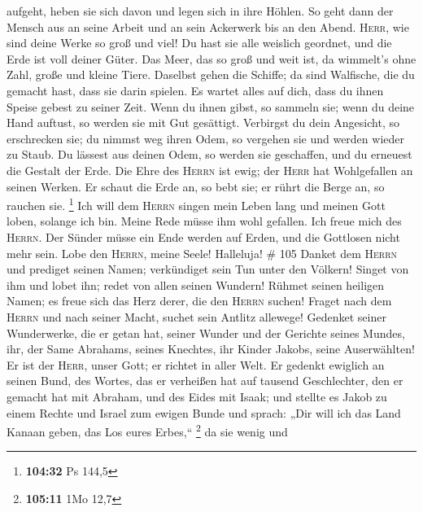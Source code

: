 aufgeht, heben sie sich davon und legen sich in ihre Höhlen.
 So geht dann der Mensch aus an seine Arbeit und an sein
Ackerwerk bis an den Abend.  \textsc{Herr}, wie sind
deine Werke so groß und viel! Du hast sie alle weislich geordnet, und
die Erde ist voll deiner Güter.  Das Meer, das so groß
und weit ist, da wimmelt's ohne Zahl, große und kleine Tiere.
 Daselbst gehen die Schiffe; da sind Walfische, die du
gemacht hast, dass sie darin spielen.  Es wartet alles
auf dich, dass du ihnen Speise gebest zu seiner Zeit. 
Wenn du ihnen gibst, so sammeln sie; wenn du deine Hand auftust, so
werden sie mit Gut gesättigt.  Verbirgst du dein
Angesicht, so erschrecken sie; du nimmst weg ihren Odem, so vergehen sie
und werden wieder zu Staub.  Du lässest aus deinen Odem,
so werden sie geschaffen, und du erneuest die Gestalt der Erde.
 Die Ehre des \textsc{Herrn} ist ewig; der \textsc{Herr}
hat Wohlgefallen an seinen Werken.  Er schaut die Erde
an, so bebt sie; er rührt die Berge an, so rauchen sie. \footnote{\textbf{104:32}
  Ps 144,5}  Ich will dem \textsc{Herrn} singen mein
Leben lang und meinen Gott loben, solange ich bin.  Meine
Rede müsse ihm wohl gefallen. Ich freue mich des \textsc{Herrn}.
 Der Sünder müsse ein Ende werden auf Erden, und die
Gottlosen nicht mehr sein. Lobe den \textsc{Herrn}, meine Seele!
Halleluja! \# 105  Danket dem \textsc{Herrn} und prediget
seinen Namen; verkündiget sein Tun unter den Völkern! 
Singet von ihm und lobet ihn; redet von allen seinen Wundern!
 Rühmet seinen heiligen Namen; es freue sich das Herz
derer, die den \textsc{Herrn} suchen!  Fraget nach dem
\textsc{Herrn} und nach seiner Macht, suchet sein Antlitz allewege!
 Gedenket seiner Wunderwerke, die er getan hat, seiner
Wunder und der Gerichte seines Mundes,  ihr, der Same
Abrahams, seines Knechtes, ihr Kinder Jakobs, seine Auserwählten!
 Er ist der \textsc{Herr}, unser Gott; er richtet in aller
Welt.  Er gedenkt ewiglich an seinen Bund, des Wortes, das
er verheißen hat auf tausend Geschlechter,  den er gemacht
hat mit Abraham, und des Eides mit Isaak;  und stellte es
Jakob zu einem Rechte und Israel zum ewigen Bunde  und
sprach: „Dir will ich das Land Kanaan geben, das Los eures Erbes,``
\footnote{\textbf{105:11} 1Mo 12,7}  da sie wenig und
